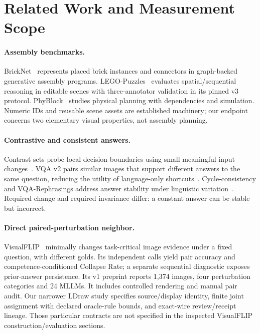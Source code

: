 \documentclass[10pt,twocolumn,letterpaper]{article}
\begin{document}
\section{Related Work and Measurement Scope}
\paragraph{Assembly benchmarks.}
BrickNet~\cite{kulits2026bricknet} represents placed brick instances and
connectors in graph-backed generative assembly programs.
LEGO-Puzzles~\cite{tang2025legopuzzles} evaluates spatial/sequential
reasoning in editable scenes with three-annotator validation in its
pinned v3 protocol. PhyBlock~\cite{ma2025phyblock} studies physical
planning with dependencies and simulation. Numeric IDs and reusable
scene assets are established machinery; our endpoint concerns two
elementary visual properties, not assembly planning.

\paragraph{Contrastive and consistent answers.}
Contrast sets probe local decision boundaries using small meaningful
input changes~\cite{gardner2020contrast}. VQA v2 pairs similar images
that support different answers to the same question, reducing the
utility of language-only shortcuts~\cite{goyal2017vqa}.
Cycle-consistency and VQA-Rephrasings address answer stability under
linguistic variation~\cite{shah2019cycle}. Required change and required
invariance differ: a constant answer can be stable but incorrect.

\paragraph{Direct paired-perturbation neighbor.}
VisualFLIP~\cite{zhu2026visualflip} minimally changes task-critical image
evidence under a fixed question, with different golds. Its independent
calls yield pair accuracy and competence-conditioned Collapse Rate; a
separate sequential diagnostic exposes prior-answer persistence.
Its v1 preprint reports 1,374 images, four perturbation categories and
24 MLLMs. It includes controlled rendering and manual pair audit.
Our narrower LDraw study specifies source/display identity, finite
joint assignment with declared oracle-rule bounds, and exact-wire
review/receipt lineage. Those particular contracts are not specified
in the inspected VisualFLIP construction/evaluation sections.
\end{document}
